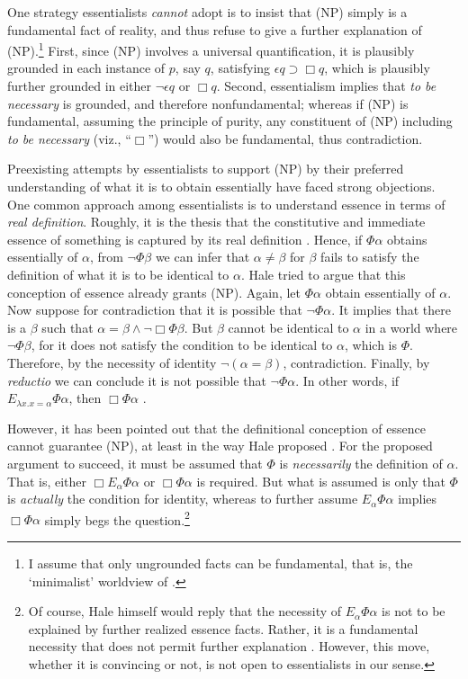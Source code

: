 \documentclass[12pt]{article}
\begin{document}
\par
One strategy essentialists \textit{cannot} adopt is to insist that (NP) simply is a fundamental fact of reality, and thus refuse to give a further explanation of (NP).\footnote{I assume that only ungrounded facts can be fundamental, that is, the `minimalist' worldview of \citet{Fine2001-FINTQO}.} First, since (NP) involves a universal quantification, it is plausibly grounded in each instance of $p$, say $q$, satisfying $\epsilon q \supset \Box q$, which is plausibly further grounded in either $\lnot \epsilon q$ or $\Box q$. Second, essentialism implies that \textit{to be necessary} is grounded, and therefore nonfundamental; whereas if (NP) is fundamental, assuming the principle of purity, any constituent of (NP) including \textit{to be necessary} (viz., ``$\Box$'') would also be fundamental, thus contradiction.  
\par
Preexisting attempts by essentialists to support (NP) by their preferred understanding of what it is to obtain essentially have faced strong objections. One common approach among essentialists is to understand essence in terms of \textit{real definition}. Roughly, it is the thesis that the constitutive and immediate essence of something is captured by its real definition \citep[e.g.,][]{Fine1994-FINEAM-2, Lowe2012-LOWWIT-2, Hale2013-HALNBA}. Hence, if $\Phi \alpha$ obtains essentially of $\alpha$, from $\lnot \Phi \beta$ we can infer that $\alpha \neq \beta$ for $\beta$ fails to satisfy the definition of what it is to be identical to $\alpha$. Hale tried to argue that this conception of essence already grants (NP). Again, let $\Phi \alpha$ obtain essentially of $\alpha$. Now suppose for contradiction that it is possible that $\lnot \Phi \alpha$. It implies that there is a $\beta$ such that $\alpha = \beta \land \lnot \Box \Phi \beta$. But $\beta$ cannot be identical to $\alpha$ in a world where $\lnot \Phi \beta$, for it does not satisfy the condition to be identical to $\alpha$, which is $\Phi$. Therefore, by the necessity of identity $\lnot (\alpha = \beta)$, contradiction. Finally, by \textit{reductio} we can conclude it is not possible that $\lnot \Phi \alpha$. In other words, if $E_{\lambda x. x = \alpha} \Phi \alpha$, then $\Box \Phi \alpha$ \citep[133]{Hale2013-HALNBA}.
\par
However, it has been pointed out that the definitional conception of essence cannot guarantee (NP), at least in the way Hale proposed \citep{Romero2019-ROMMIN,Leech2021-LEEFET-2}. For the proposed argument to succeed, it must be assumed that $\Phi$ is \textit{necessarily} the definition of $\alpha$. That is, either $\Box E_{\alpha} \Phi \alpha$ or $\Box \Phi \alpha$ is required. But what is assumed is only that $\Phi$ is \textit{actually} the condition for identity, whereas to further assume $E_{\alpha} \Phi \alpha$ implies $\Box \Phi \alpha$ simply begs the question.\footnote{Of course, Hale himself would reply that the necessity of $E_{\alpha} \Phi \alpha$ is not to be explained by further realized essence facts. Rather, it is a fundamental necessity that does not permit further explanation \citep[158]{Hale2013-HALNBA}. However, this move, whether it is convincing or not, is not open to essentialists in our sense.}
\end{document}
